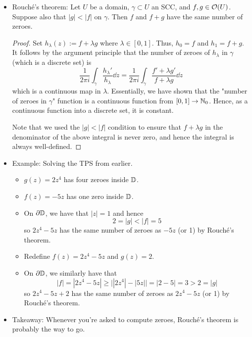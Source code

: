 \documentclass[../notes.tex]{subfiles}
\begin{document}
\begin{itemize}
    \item Rouch\'{e}'s theorem: Let $U$ be a domain, $\gamma\subset U$ an SCC, and $f,g\in\mathcal{O}(U)$. Suppose also that $|g|<|f|$ on $\gamma$. Then $f$ and $f+g$ have the same number of zeroes.
    \begin{proof}
        Set $h_\lambda(z):=f+\lambda g$ where $\lambda\in[0,1]$. Thus, $h_0=f$ and $h_1=f+g$. It follows by the argument principle that the number of zeroes of $h_\lambda$ in $\gamma$ (which is a discrete set) is
        \begin{equation*}
            \frac{1}{2\pi i}\int_\gamma\frac{h_\lambda'}{h_\lambda}\dd{z} = \frac{1}{2\pi i}\int_\gamma\frac{f'+\lambda g'}{f+\lambda g}\dd{z}
        \end{equation*}
        which is a continuous map in $\lambda$. Essentially, we have shown that the "number of zeroes in $\gamma$" function is a continuous function from $[0,1]\to\mathbb{N}_0$. Hence, as a continuous function into a discrete set, it is constant.\par
        Note that we used the $|g|<|f|$ condition to ensure that $f+\lambda g$ in the denominator of the above integral is never zero, and hence the integral is always well-defined.
    \end{proof}
    \item Example: Solving the TPS from earlier.
    \begin{itemize}
        \item $g(z)=2z^4$ has four zeroes inside $\mathbb{D}$.
        \item $f(z)=-5z$ has one zero inside $\mathbb{D}$.
        \item On $\partial\mathbb{D}$, we have that $|z|=1$ and hence
        \begin{equation*}
            2 = |g| < |f| = 5
        \end{equation*}
        so $2z^4-5z$ has the same number of zeroes as $-5z$ (or 1) by Rouch\'{e}'s theorem.
        \item Redefine $f(z)=2z^4-5z$ and $g(z)=2$.
        \item On $\partial\mathbb{D}$, we similarly have that
        \begin{equation*}
            |f| = |2z^4-5z|
            \geq \big| |2z^4|-|5z| \big|
            = |2-5|
            = 3
            > 2
            = |g|
        \end{equation*}
        so $2z^4-5z+2$ has the same number of zeroes as $2z^4-5z$ (or 1) by Rouch\'{e}'s theorem.
    \end{itemize}
    \item Takeaway: Whenever you're asked to compute zeroes, Rouch\'{e}'s theorem is probably the way to go.

\end{itemize}
\end{document}
